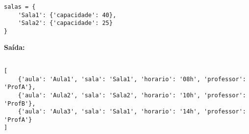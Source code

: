 \documentclass{article}
\begin{document}
\begin{enumerate}
\begin{enumerate}
\begin{verbatim}
salas = {
    'Sala1': {'capacidade': 40},
    'Sala2': {'capacidade': 25}
}
\end{verbatim}

\textbf{Saída:}
\begin{verbatim}

[
    {'aula': 'Aula1', 'sala': 'Sala1', 'horario': '08h', 'professor': 'ProfA'},
    {'aula': 'Aula2', 'sala': 'Sala2', 'horario': '10h', 'professor': 'ProfB'},
    {'aula': 'Aula3', 'sala': 'Sala1', 'horario': '14h', 'professor': 'ProfA'}
]


\end{verbatim}
        

\end{enumerate}
\end{enumerate}
\end{document}
